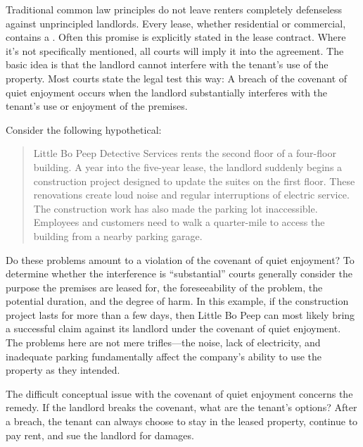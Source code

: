 Traditional common law principles do not leave renters completely defenseless
against unprincipled landlords.  Every lease, whether residential or
commercial, contains a .  Often this
promise is explicitly stated in the lease contract.  Where it's not
specifically mentioned, all courts will imply it into the agreement.  The basic
idea is that the landlord cannot interfere with the tenant's use of the
property.  Most courts state the legal test this way: A breach of the covenant
of quiet enjoyment occurs when the landlord substantially interferes with the
tenant's use or enjoyment of the premises.  

Consider the following hypothetical: 
\begin{quote}\edfont
Little Bo Peep Detective Services rents the second floor of a four-floor
building.  A year into the five-year lease, the landlord suddenly begins a
construction project designed to update the suites on the first floor.  These
renovations create loud noise and regular interruptions of electric service.
The construction work has also made the parking lot inaccessible.  Employees
and customers need to walk a quarter-mile to access the building from a nearby
parking garage.  
\end{quote}
Do these problems amount to a violation of the covenant of quiet enjoyment?  To
determine whether the interference is ``substantial'' courts generally consider
the purpose the premises are leased for, the foreseeability of the problem, the
potential duration, and the degree of harm. In this example, if the
construction project lasts for more than a few days, then Little Bo Peep can
most likely bring a successful claim against its landlord under the covenant of
quiet enjoyment.  The problems here are not mere trifles---the noise, lack of
electricity, and inadequate parking fundamentally affect the company's ability
to use the property as they intended.  

The difficult conceptual issue with the covenant of quiet enjoyment concerns the
remedy.  If the landlord breaks the covenant, what are the tenant's options? 
After a breach, the tenant can always choose to stay in the leased property,
continue to pay rent, and sue the landlord for damages.  

